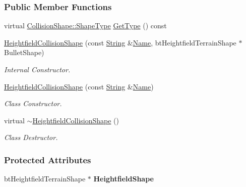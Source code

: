 \subsubsection*{Public Member Functions}
\begin{DoxyCompactItemize}
\item 
virtual \hyperlink{classMezzanine_1_1CollisionShape_ad04186055565998879b64176d6dd100d}{CollisionShape::ShapeType} \hyperlink{classMezzanine_1_1HeightfieldCollisionShape_af27ffaf88fc12af6ddc89704e60ecd33}{GetType} () const 
\item 
\hyperlink{classMezzanine_1_1HeightfieldCollisionShape_a79b5e672a6bded0e2f38587b901247ab}{HeightfieldCollisionShape} (const \hyperlink{namespaceMezzanine_acf9fcc130e6ebf08e3d8491aebcf1c86}{String} \&\hyperlink{classMezzanine_1_1CollisionShape_aac524c5c56fa4d158bc071f8aecfbe79}{Name}, btHeightfieldTerrainShape $\ast$BulletShape)
\begin{DoxyCompactList}\small\item\em Internal Constructor. \item\end{DoxyCompactList}\item 
\hyperlink{classMezzanine_1_1HeightfieldCollisionShape_aee6afa08c9007498cc0693b8bfb2da95}{HeightfieldCollisionShape} (const \hyperlink{namespaceMezzanine_acf9fcc130e6ebf08e3d8491aebcf1c86}{String} \&\hyperlink{classMezzanine_1_1CollisionShape_aac524c5c56fa4d158bc071f8aecfbe79}{Name})
\begin{DoxyCompactList}\small\item\em Class Constructor. \item\end{DoxyCompactList}\item 
\hypertarget{classMezzanine_1_1HeightfieldCollisionShape_ac9521af83a3d96d3f2c71c5a8a39b09d}{
virtual \hyperlink{classMezzanine_1_1HeightfieldCollisionShape_ac9521af83a3d96d3f2c71c5a8a39b09d}{$\sim$HeightfieldCollisionShape} ()}
\label{classMezzanine_1_1HeightfieldCollisionShape_ac9521af83a3d96d3f2c71c5a8a39b09d}

\begin{DoxyCompactList}\small\item\em Class Destructor. \item\end{DoxyCompactList}\end{DoxyCompactItemize}
\subsubsection*{Protected Attributes}
\begin{DoxyCompactItemize}
\item 
\hypertarget{classMezzanine_1_1HeightfieldCollisionShape_a326d019561da25f1eddeb7fb59748f9c}{
btHeightfieldTerrainShape $\ast$ {\bfseries HeightfieldShape}}
\label{classMezzanine_1_1HeightfieldCollisionShape_a326d019561da25f1eddeb7fb59748f9c}

\end{DoxyCompactItemize}


